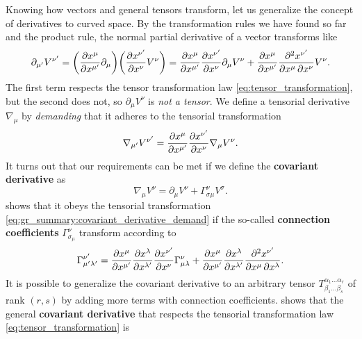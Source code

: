 Knowing how vectors and general tensors transform, let us generalize the concept of derivatives to curved space.
By the transformation rules we have found so far and the product rule, the normal partial derivative of a vector transforms like
\begin{equation}
	\partial_{\mu'} V^{\nu'} = \bigg( \pdv{x^{\mu}}{x^{\mu'}} \partial_\mu \bigg) \bigg( \pdv{x^{\nu'}}{x^{\nu}} V^\nu \bigg)
	                         = \pdv{x^{\mu}}{x^{\mu'}} \pdv{x^{\nu'}}{x^{\nu}} \partial_\mu V^\nu + \pdv{x^{\mu}}{x^{\mu'}} \pdv{x^{\nu'}}{x^\mu, x^\nu} V^\nu .
\end{equation}
The first term respects the tensor transformation law \eqref{eq:tensor_transformation}, but the second does not, so $\partial_\mu V^\nu$ is \emph{not a tensor}.
We define a tensorial derivative $\nabla_\mu$ by \emph{demanding} that it adheres to the tensorial transformation
\begin{equation}
	\nabla_{\mu'} V^{\nu'} = \pdv{x^{\mu}}{x^{\mu'}} \pdv{x^{\nu'}}{x^{\nu}} \nabla_\mu V^\nu .
\label{eq:gr_summary:covariant_derivative_demand}
\end{equation}
It turns out that our requirements can be met if we define the \textbf{covariant derivative} as
\begin{equation}
	\nabla_\mu V^\nu = \partial_\mu V^\nu + \Gamma_{\sigma \mu}^\nu V^\sigma .
\end{equation}
\cite[equation 3.6-3.10]{ref:carroll} shows that it obeys the tensorial transformation \eqref{eq:gr_summary:covariant_derivative_demand} if the so-called \textbf{connection coefficients} $\Gamma_{\sigma _\mu}^\nu$ transform according to
\begin{equation}
	\Gamma^{\nu'}_{\mu' \lambda'} = \pdv{x^{\mu}}{x^{\mu'}} \pdv{x^{\lambda}}{x^{\lambda'}} \pdv{x^{\nu'}}{x^{\nu}}  \Gamma^{\nu}_{\mu \lambda} + \pdv{x^{\mu}}{x^{\mu'}} \pdv{x^{\lambda}}{x^{\lambda'}} \pdv{x^{\nu'}}{x^\mu, x^\lambda} .
	\label{eq:connection_transformation}
\end{equation}
It is possible to generalize the covariant derivative to an arbitrary tensor $T^{\alpha_1 \ldots \alpha_r}_{\beta_1 \ldots \beta_s}$ of rank $(r,s)$ by adding more terms with connection coefficients.
\cite[equation 3.11-3.16]{ref:carroll} shows that the general \textbf{covariant derivative} that respects the tensorial transformation law \eqref{eq:tensor_transformation} is
